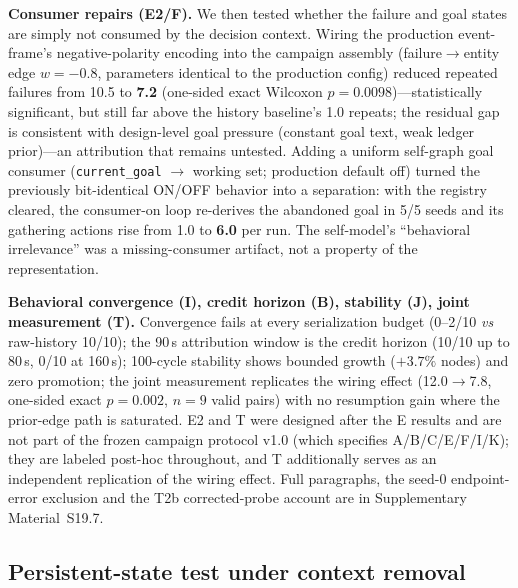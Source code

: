 \documentclass[10pt]{article}
\begin{document}
\textbf{Consumer repairs (E2/F).} We then tested whether the failure
and goal states are simply not consumed by the decision context.
Wiring the production event-frame's negative-polarity encoding into
the campaign assembly (failure$\rightarrow$entity edge $w{=}{-}0.8$,
parameters identical to the production config) reduced repeated
failures from 10.5 to \textbf{7.2} (one-sided exact Wilcoxon
$p{=}0.0098$)---statistically significant, but still far above the history baseline's 1.0 repeats; the residual gap is consistent with design-level goal pressure (constant goal text, weak ledger prior)---an attribution that remains untested. Adding a uniform self-graph goal consumer
(\texttt{current\_goal} $\rightarrow$ working set; production default
off) turned the previously bit-identical ON/OFF behavior into a
separation: with the registry cleared, the consumer-on loop re-derives
the abandoned goal in 5/5 seeds and its gathering actions rise from
1.0 to \textbf{6.0} per run. The self-model's ``behavioral
irrelevance'' was a missing-consumer artifact, not a property of the
representation.

\textbf{Behavioral convergence (I), credit horizon (B), stability (J), joint measurement (T).} Convergence fails at every serialization budget (0--2/10 \emph{vs} raw-history 10/10); the 90\,s attribution window is the credit horizon (10/10 up to 80\,s, 0/10 at 160\,s); 100-cycle stability shows bounded growth ($+3.7\%$ nodes) and zero promotion; the joint measurement replicates the wiring effect (12.0$\rightarrow$7.8, one-sided exact $p{=}0.002$, $n{=}9$ valid pairs) with no resumption gain where the prior-edge path is saturated. E2 and T were designed after the E results and are not part of the frozen campaign protocol v1.0 (which specifies A/B/C/E/F/I/K); they are labeled post-hoc throughout, and T additionally serves as an independent replication of the wiring effect. Full paragraphs, the seed-0 endpoint-error exclusion and the T2b corrected-probe account are in Supplementary Material~S19.7.

\subsection{Persistent-state test under context removal}
\label{sec:res-psa}
\end{document}
